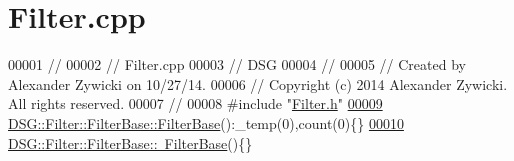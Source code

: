 \hypertarget{_filter_8cpp_source}{\section{Filter.\+cpp}
\label{_filter_8cpp_source}
}

\begin{DoxyCode}
00001 \textcolor{comment}{//}
00002 \textcolor{comment}{//  Filter.cpp}
00003 \textcolor{comment}{//  DSG}
00004 \textcolor{comment}{//}
00005 \textcolor{comment}{//  Created by Alexander Zywicki on 10/27/14.}
00006 \textcolor{comment}{//  Copyright (c) 2014 Alexander Zywicki. All rights reserved.}
00007 \textcolor{comment}{//}
00008 \textcolor{preprocessor}{#include "\hyperlink{_filter_8h}{Filter.h}"}
\hypertarget{_filter_8cpp_source_l00009}{}\hyperlink{class_d_s_g_1_1_filter_1_1_filter_base_accc0a6729e252abaa24ad7f72b2f351d}{00009} \hyperlink{class_d_s_g_1_1_filter_1_1_filter_base_accc0a6729e252abaa24ad7f72b2f351d}{DSG::Filter::FilterBase::FilterBase}():\_temp(0),count(0)\{\}
\hypertarget{_filter_8cpp_source_l00010}{}\hyperlink{class_d_s_g_1_1_filter_1_1_filter_base_a1e220c7fe383eba4822f3896d8b2c2b2}{00010} \hyperlink{class_d_s_g_1_1_filter_1_1_filter_base_a1e220c7fe383eba4822f3896d8b2c2b2}{DSG::Filter::FilterBase::~FilterBase}()\{\}
\end{DoxyCode}
